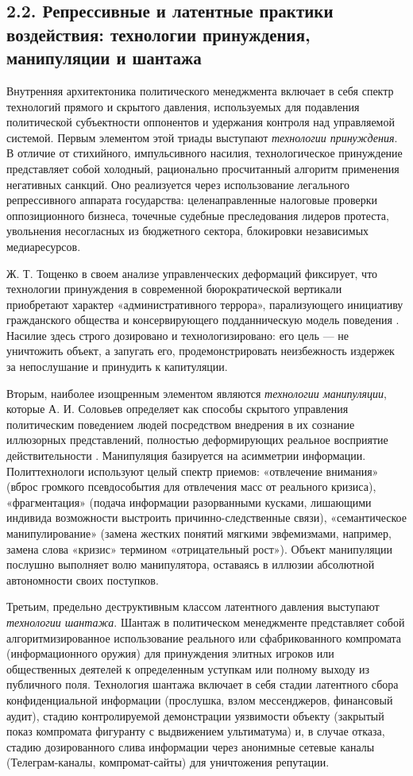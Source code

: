 \subsection{2.2. Репрессивные и латентные практики воздействия: технологии принуждения, манипуляции и шантажа}

Внутренняя архитектоника политического менеджмента включает в себя спектр технологий прямого и скрытого давления, используемых для подавления политической субъектности оппонентов и удержания контроля над управляемой системой. Первым элементом этой триады выступают \textit{технологии принуждения}. В отличие от стихийного, импульсивного насилия, технологическое принуждение представляет собой холодный, рационально просчитанный алгоритм применения негативных санкций. Оно реализуется через использование легального репрессивного аппарата государства: целенаправленные налоговые проверки оппозиционного бизнеса, точечные судебные преследования лидеров протеста, увольнения несогласных из бюджетного сектора, блокировки независимых медиаресурсов. 

Ж. Т. Тощенко в своем анализе управленческих деформаций фиксирует, что технологии принуждения в современной бюрократической вертикали приобретают характер «административного террора», парализующего инициативу гражданского общества и консервирующего подданническую модель поведения \cite{Toschenko}. Насилие здесь строго дозировано и технологизировано: его цель — не уничтожить объект, а запугать его, продемонстрировать неизбежность издержек за непослушание и принудить к капитуляции.

Вторым, наиболее изощренным элементом являются \textit{технологии манипуляции}, которые А. И. Соловьев определяет как способы скрытого управления политическим поведением людей посредством внедрения в их сознание иллюзорных представлений, полностью деформирующих реальное восприятие действительности \cite{Solovyev}. Манипуляция базируется на асимметрии информации. Политтехнологи используют целый спектр приемов: «отвлечение внимания» (вброс громкого псевдособытия для отвлечения масс от реального кризиса), «фрагментация» (подача информации разорванными кусками, лишающими индивида возможности выстроить причинно-следственные связи), «семантическое манипулирование» (замена жестких понятий мягкими эвфемизмами, например, замена слова «кризис» термином «отрицательный рост»). Объект манипуляции послушно выполняет волю манипулятора, оставаясь в иллюзии абсолютной автономности своих поступков.

Третьим, предельно деструктивным классом латентного давления выступают \textit{технологии шантажа}. Шантаж в политическом менеджменте представляет собой алгоритмизированное использование реального или сфабрикованного компромата (информационного оружия) для принуждения элитных игроков или общественных деятелей к определенным уступкам или полному выходу из публичного поля. Технология шантажа включает в себя стадии латентного сбора конфиденциальной информации (прослушка, взлом мессенджеров, финансовый аудит), стадию контролируемой демонстрации уязвимости объекту (закрытый показ компромата фигуранту с выдвижением ультиматума) и, в случае отказа, стадию дозированного слива информации через анонимные сетевые каналы (Телеграм-каналы, компромат-сайты) для уничтожения репутации. 

